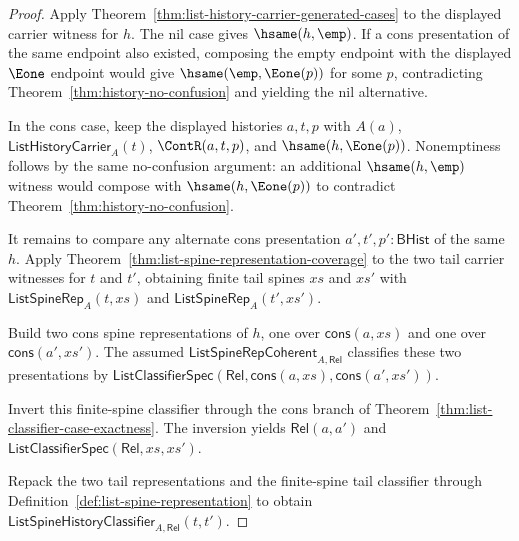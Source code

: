 \begin{proof}
Apply Theorem~\ref{thm:list-history-carrier-generated-cases} to the displayed
carrier witness for $h$. The nil case gives $\hsame(h,\emp)$. If a cons
presentation of the same endpoint also existed, composing the empty endpoint
with the displayed $\Eone$ endpoint would give $\hsame(\emp,\Eone(p))$ for some
$p$, contradicting Theorem~\ref{thm:history-no-confusion} and yielding the nil
alternative.

In the cons case, keep the displayed histories $a,t,p$ with $A(a)$,
$\mathsf{ListHistoryCarrier}_A(t)$, $\ContR(a,t,p)$, and
$\hsame(h,\Eone(p))$. Nonemptiness follows by the same no-confusion argument:
an additional $\hsame(h,\emp)$ witness would compose with $\hsame(h,\Eone(p))$
to contradict Theorem~\ref{thm:history-no-confusion}.

It remains to compare any alternate cons presentation
$a',t',p':\mathsf{BHist}$ of the same $h$. Apply
Theorem~\ref{thm:list-spine-representation-coverage} to the two tail carrier
witnesses for $t$ and $t'$, obtaining finite tail spines $xs$ and $xs'$ with
$\mathsf{ListSpineRep}_A(t,xs)$ and $\mathsf{ListSpineRep}_A(t',xs')$.

Build two cons spine representations of $h$, one over $\mathsf{cons}(a,xs)$
and one over $\mathsf{cons}(a',xs')$. The assumed
$\mathsf{ListSpineRepCoherent}_{A,\mathsf{Rel}}$ classifies these two
presentations by $\mathsf{ListClassifierSpec}(\mathsf{Rel},\mathsf{cons}(a,xs),
\mathsf{cons}(a',xs'))$.

Invert this finite-spine classifier through the cons branch of
Theorem~\ref{thm:list-classifier-case-exactness}. The inversion yields
$\mathsf{Rel}(a,a')$ and
$\mathsf{ListClassifierSpec}(\mathsf{Rel},xs,xs')$.

Repack the two tail representations and the finite-spine tail classifier through
Definition~\ref{def:list-spine-representation} to obtain
$\mathsf{ListSpineHistoryClassifier}_{A,\mathsf{Rel}}(t,t')$.
\end{proof}

